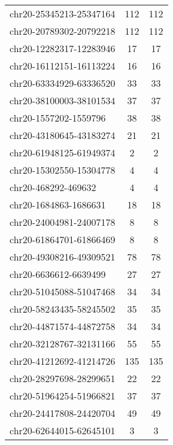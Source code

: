 \begin{longtable}{lSS}
	chr20-25345213-25347164 & 112    & 112                        \\
	chr20-20789302-20792218 & 112    & 112                        \\
	chr20-12282317-12283946 & 17     & 17                         \\
	chr20-16112151-16113224 & 16     & 16                         \\
	chr20-63334929-63336520 & 33     & 33                         \\
	chr20-38100003-38101534 & 37     & 37                         \\
	chr20-1557202-1559796   & 38     & 38                         \\
	chr20-43180645-43183274 & 21     & 21                         \\
	chr20-61948125-61949374 & 2      & 2                          \\
	chr20-15302550-15304778 & 4      & 4                          \\
	chr20-468292-469632     & 4      & 4                          \\
	chr20-1684863-1686631   & 18     & 18                         \\
	chr20-24004981-24007178 & 8      & 8                          \\
	chr20-61864701-61866469 & 8      & 8                          \\
	chr20-49308216-49309521 & 78     & 78                         \\
	chr20-6636612-6639499   & 27     & 27                         \\
	chr20-51045088-51047468 & 34     & 34                         \\
	chr20-58243435-58245502 & 35     & 35                         \\
	chr20-44871574-44872758 & 34     & 34                         \\
	chr20-32128767-32131166 & 55     & 55                         \\
	chr20-41212692-41214726 & 135    & 135                        \\
	chr20-28297698-28299651 & 22     & 22                         \\
	chr20-51964254-51966821 & 37     & 37                         \\
	chr20-24417808-24420704 & 49     & 49                         \\
	chr20-62644015-62645101 & 3      & 3                          \\

\end{longtable}
